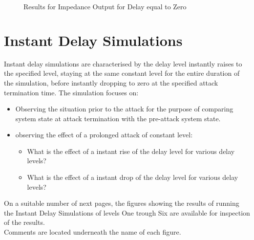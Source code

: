\begin{figure}[H]
\begin{tabular}{c}
  \end{tabular}
\caption{Results for Impedance Output for Delay equal to Zero }


\label{fig:ImpedanceZeroDelay}
\end{figure}









\section{Instant Delay Simulations}
Instant delay simulations are characterised by the delay level instantly raises to the specified level, staying at the same constant level for the entire duration of the simulation, before instantly dropping to zero at the specified attack termination time.
The simulation focuses on:
\begin{itemize}
    \item Observing the situation prior to the attack for the purpose of comparing system state at attack termination with the pre-attack system state.
    \item observing the effect of a prolonged attack of constant level:
    \begin{itemize}
        \item What is the effect of a instant rise of the delay level for various delay levels?
        \item What is the effect of a instant drop of the delay level for various delay levels?
    \end{itemize}
\end{itemize}

On a suitable number of next pages, the figures showing the results of running the Instant Delay Simulations of levels One trough Six are available for inspection of the results. \\ Comments are located underneath the name of each figure.








